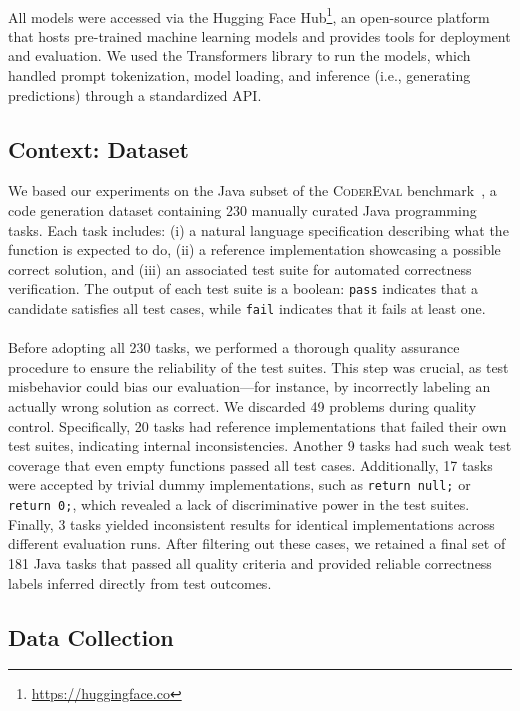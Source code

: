 \documentclass[a4paper]{usiinfbachelorproject}
\begin{document}
\\[2pt]
All models were accessed via the Hugging Face Hub\footnote{\url{https://huggingface.co}}, an open-source platform that hosts pre-trained machine learning models and provides tools for deployment and evaluation. We used the Transformers library to run the models, which handled prompt tokenization, model loading, and inference (i.e., generating predictions) through a standardized API.

\subsection{Context: Dataset}\label{sec:dataset}
We based our experiments on the Java subset of the \textsc{CoderEval} benchmark~\cite{coderEval2023}, a code generation dataset containing 230 manually curated Java programming tasks. Each task includes: (i) a natural language specification describing what the function is expected to do, (ii) a reference implementation showcasing a possible correct solution, and (iii) an associated test suite for automated correctness verification. The output of each test suite is a boolean: \texttt{pass} indicates that a candidate satisfies all test cases, while \texttt{fail} indicates that it fails at least one.\\
\\[2pt]
Before adopting all 230 tasks, we performed a thorough quality assurance procedure to ensure the reliability of the test suites. This step was crucial, as test misbehavior could bias our evaluation—for instance, by incorrectly labeling an actually wrong solution as correct. We discarded 49 problems during quality control. Specifically, 20 tasks had reference implementations that failed their own test suites, indicating internal inconsistencies. Another 9 tasks had such weak test coverage that even empty functions passed all test cases. Additionally, 17 tasks were accepted by trivial dummy implementations, such as \texttt{return null;} or \texttt{return 0;}, which revealed a lack of discriminative power in the test suites. Finally, 3 tasks yielded inconsistent results for identical implementations across different evaluation runs. After filtering out these cases, we retained a final set of 181 Java tasks that passed all quality criteria and provided reliable correctness labels inferred directly from test outcomes.

\subsection{Data Collection}\label{sec:collection}
\end{document}
